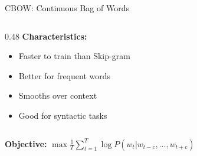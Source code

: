 \documentclass[aspectratio=169]{beamer}
\begin{document}
\begin{frame}[shrink=10]{CBOW: Continuous Bag of Words 🎒}
\begin{columns}[T]
\begin{column}{0.48\textwidth}
\vspace{0.5em}
\textbf{Characteristics:}
\begin{itemize}\setlength{\itemsep}{0pt}
    \item \alert{Faster} to train than Skip-gram
    \item Better for frequent words
    \item Smooths over context
    \item Good for syntactic tasks
\end{itemize}
\end{column}
\end{columns}

\vspace{0.5em}
\textbf{Objective:} $\max \frac{1}{T}\sum_{t=1}^T \log P(w_t | w_{t-c},...,w_{t+c})$
\end{frame}
\end{document}
